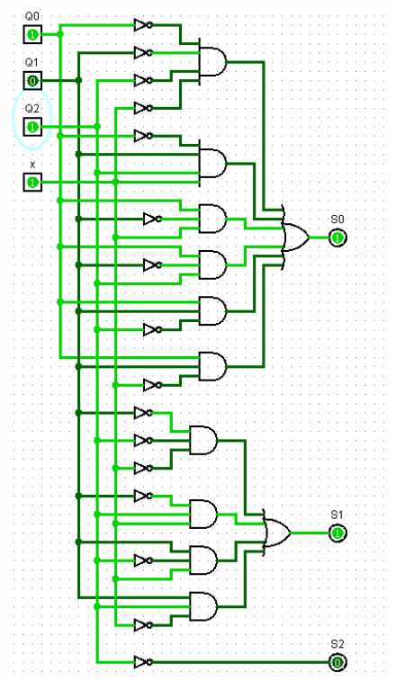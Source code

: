 \documentclass[]{article}
\begin{document}
\begin{minipage}{0.5\textwidth}
\begin{figure}[H]
	\centering
	\includegraphics[width=1\textwidth]{test1_5.png}
\end{figure}
\end{minipage}
\end{document}
